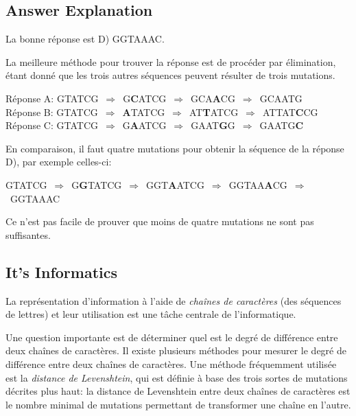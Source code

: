 \documentclass[a4paper,11pt]{report}
\makeatletter
\renewenvironment{adjustwidth}[2]{%
    \begin{list}{}{%
    \partopsep\z@%
    \topsep\z@%
    \listparindent\parindent%
    \parsep\parskip%
    \@ifmtarg{#1}{\setlength{\leftmargin}{\z@}}%
                 {\setlength{\leftmargin}{#1}}%
    \@ifmtarg{#2}{\setlength{\rightmargin}{\z@}}%
                 {\setlength{\rightmargin}{#2}}%
    }
    \item[]}{\end{list}}
\makeatother
\begin{document}
\endgroup

\subsection*{Answer Explanation}

La bonne réponse est D) GGTAAAC.

La meilleure méthode pour trouver la réponse est de procéder par élimination, étant donné que les trois autres séquences peuvent résulter de trois mutations.

\begin{adjustwidth}{1.5em}{0em}
Réponse A: GTATCG~\ensuremath{\Rightarrow}~G\textbf{C}ATCG~\ensuremath{\Rightarrow}~GCA\textbf{A}CG~\ensuremath{\Rightarrow}~GCAATG \\
Réponse B: GTATCG~\ensuremath{\Rightarrow}~\textbf{A}TATCG~\ensuremath{\Rightarrow}~AT\textbf{T}ATCG~\ensuremath{\Rightarrow}~ATTAT\textbf{C}CG \\
Réponse C: GTATCG~\ensuremath{\Rightarrow}~G\textbf{A}ATCG~\ensuremath{\Rightarrow}~GAAT\textbf{G}G~\ensuremath{\Rightarrow}~GAATG\textbf{C}
\end{adjustwidth}

En comparaison, il faut quatre mutations pour obtenir la séquence de la réponse D), par exemple celles-ci:

\begin{adjustwidth}{1.5em}{0em}
GTATCG~\ensuremath{\Rightarrow}~G\textbf{G}TATCG~\ensuremath{\Rightarrow}~GGT\textbf{A}ATCG~\ensuremath{\Rightarrow}~GGTAA\textbf{A}CG~\ensuremath{\Rightarrow}~GGTAAAC
\end{adjustwidth}

Ce n’est pas facile de prouver que moins de quatre mutations ne sont pas suffisantes.


\subsection*{It’s Informatics}

La représentation d’information à l’aide de \emph{chaînes de caractères} (des séquences de lettres) et leur utilisation est une tâche centrale de l’informatique.

Une question importante est de déterminer quel est le degré de différence entre deux chaînes de caractères. Il existe plusieurs méthodes pour mesurer le degré de différence entre deux chaînes de caractères. Une méthode fréquemment utilisée est la \emph{distance de Levenshtein}, qui est définie à base des trois sortes de mutations décrites plus haut: la distance de Levenshtein entre deux chaînes de caractères est le nombre minimal de mutations permettant de transformer une chaîne en l’autre.
\end{document}
